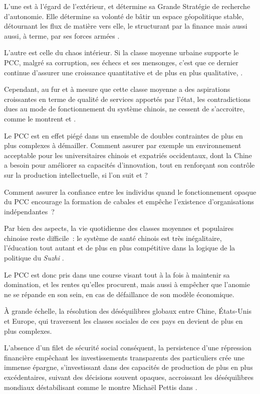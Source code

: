 \documentclass[a4paper]{article}
\begin{document}
L’une est à l’égard de l’extérieur, et détermine sa Grande Stratégie de recherche d’autonomie. Elle détermine sa volonté de bâtir un espace géopolitique stable, détournant les flux de matière vers elle, le structurant par la finance mais aussi aussi, à terme, par ses forces armées \cite{khan18_haunt}. 

L’autre est celle du chaos intérieur. Si la classe moyenne urbaine supporte le PCC, malgré sa corruption, ses échecs et ses mensonges, c’est que ce dernier continue d’assurer une croissance quantitative et de plus en plus qualitative, \cite{dickson16}.

Cependant, au fur et à mesure que cette classe moyenne a des aspirations croissantes en terme de qualité de services apportés par l’état, les contradictions dues au mode de fonctionnement du système chinois, ne cessent de s’accroitre, comme le montrent \cite{cabestan18_demain_chine} et \cite{dickson16}.

 Le PCC est en effet piégé dans un ensemble de doubles contraintes de plus en plus complexes à démailler. Comment assurer par exemple un environnement acceptable pour les universitaires chinois et expatriés occidentaux, dont la Chine a besoin pour améliorer sa capacités d’innovation, tout en renforçant son contrôle sur la production intellectuelle, si l’on suit \cite{haour16_creat_china}
et \cite{simon09_chinas}?

Comment assurer la confiance entre les individus quand le fonctionnement opaque du PCC encourage la formation de cabales et empêche l’existence d’orga\-ni\-sa\-tions indépendantes~?

Par bien des aspects, la vie quotidienne des classes moyennes et populaires chinoise reste difficile~: le système de santé chinois est très inégalitaire, l’éducation tout autant et de plus en plus compétitive dans la logique de la politique du \textit{Suzhi} \cite{damien14_in}.

Le PCC est donc pris dans une course visant tout à la fois à maintenir sa domination, et les rentes qu’elles procurent, mais aussi à empêcher que l’anomie ne se répande en son sein, en cas de défaillance de son modèle économique.

À grande échelle, la résolution des déséquilibres globaux entre Chine, États-Unis et Europe, qui traversent les classes sociales de ces pays en devient de plus en plus complexes.

L’absence d’un filet de sécurité social conséquent, la persistence d’une répression financière empêchant les investissements transparents des particuliers crée une immense épargne, s’investissant dans des capacités de production de plus en plus excédentaires, suivant des décisions souvent opaques, accroissant les déséquilibres mondiaux déstabilisant comme le montre Michaël Pettis dans \cite{klein20_trade}. 
\end{document}
